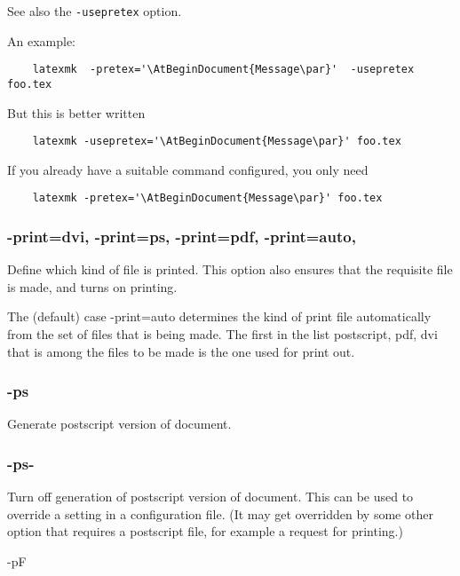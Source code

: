See also the \verb|-usepretex| option.

An example:

\begin{verbatim}
	latexmk  -pretex='\AtBeginDocument{Message\par}'  -usepretex foo.tex
\end{verbatim}

But this is better written

\begin{verbatim}
	latexmk -usepretex='\AtBeginDocument{Message\par}' foo.tex
\end{verbatim}

If you already have a suitable command configured, you only need

\begin{verbatim}
	latexmk -pretex='\AtBeginDocument{Message\par}' foo.tex
\end{verbatim}

\subsubsection{-print=dvi, -print=ps, -print=pdf, -print=auto,}

Define which kind of file is printed.  This option also  ensures that the
requisite file is made, and turns on printing.

The (default) case -print=auto determines the kind of print file automatically
from the set of files that  is  being  made.   The first  in  the list
postscript, pdf, dvi that is among the files to be made is the one used for
print out.


\subsubsection{-ps}

Generate postscript version of document.

\subsubsection{-ps-}

Turn off generation of postscript version of document.  This can
be  used to override a setting in a configuration file.  (It may
get overridden by some other option that requires  a  postscript
file, for example a request for printing.)

-pF

